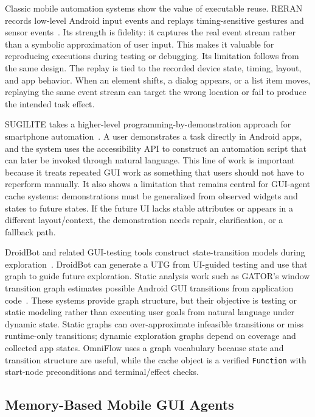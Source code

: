 \documentclass[sigplan,10pt]{acmart}
\newcommand{\sysname}{OmniFlow\xspace}
\begin{document}
Classic mobile automation systems show the value of executable reuse. RERAN
records low-level Android input events and replays timing-sensitive gestures and
sensor events~\cite{gomez2013reran}. Its strength is fidelity: it captures the
real event stream rather than a symbolic approximation of user input. This makes
it valuable for reproducing executions during testing or debugging. Its
limitation follows from the same design. The replay is tied to the recorded
device state, timing, layout, and app behavior. When an element shifts, a dialog
appears, or a list item moves, replaying the same event stream can target the
wrong location or fail to produce the intended task effect.

SUGILITE takes a higher-level programming-by-demonstration approach for
smartphone automation~\cite{li2017sugilite}. A user demonstrates a task directly
in Android apps, and the system uses the accessibility API to construct an
automation script that can later be invoked through natural language. This line
of work is important because it treats repeated GUI work as something that users
should not have to reperform manually. It also shows a limitation that remains
central for GUI-agent cache systems: demonstrations must be generalized from
observed widgets and states to future states. If the future UI lacks stable
attributes or appears in a different layout/context, the demonstration needs
repair, clarification, or a fallback path.

DroidBot and related GUI-testing tools construct state-transition models during
exploration~\cite{droidbot}. DroidBot can generate a UTG from UI-guided testing
and use that graph to guide future exploration. Static analysis work such as
GATOR's window transition graph estimates possible Android GUI transitions from
application code~\cite{gator}. These systems provide graph structure, but their
objective is testing or static modeling rather than executing user goals from
natural language under dynamic state. Static graphs can over-approximate
infeasible transitions or miss runtime-only transitions; dynamic exploration
graphs depend on coverage and collected app states. \sysname uses a graph
vocabulary because state and transition structure are useful, while the cache
object is a verified \texttt{Function} with start-node preconditions and
terminal/effect checks.

\subsection{Memory-Based Mobile GUI Agents}
\end{document}
